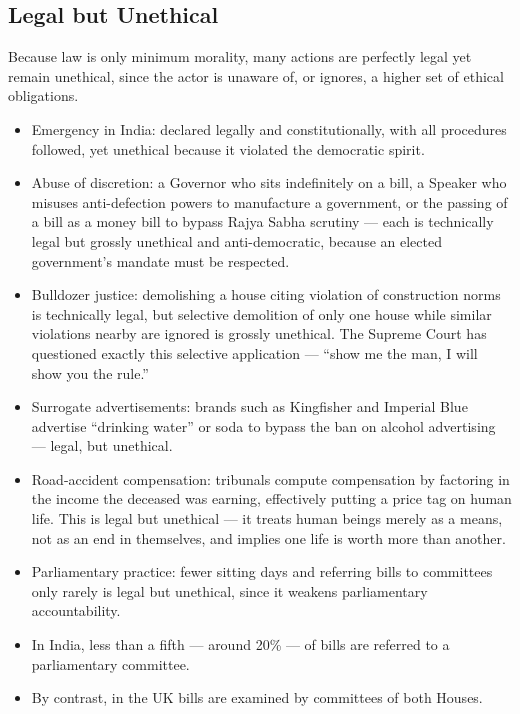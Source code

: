 \subsection{Legal but Unethical}

Because law is only minimum morality, many actions are perfectly legal yet remain unethical, since the actor is unaware of, or ignores, a higher set of ethical obligations.

\begin{itemize}
\item Emergency in India: declared legally and constitutionally, with all procedures followed, yet unethical because it violated the democratic spirit.
\item Abuse of discretion: a Governor who sits indefinitely on a bill, a Speaker who misuses anti-defection powers to manufacture a government, or the passing of a bill as a money bill to bypass Rajya Sabha scrutiny --- each is technically legal but grossly unethical and anti-democratic, because an elected government's mandate must be respected.
\item Bulldozer justice: demolishing a house citing violation of construction norms is technically legal, but selective demolition of only one house while similar violations nearby are ignored is grossly unethical. The Supreme Court has questioned exactly this selective application --- ``show me the man, I will show you the rule.''
\item Surrogate advertisements: brands such as Kingfisher and Imperial Blue advertise ``drinking water'' or soda to bypass the ban on alcohol advertising --- legal, but unethical.
\item Road-accident compensation: tribunals compute compensation by factoring in the income the deceased was earning, effectively putting a price tag on human life. This is legal but unethical --- it treats human beings merely as a means, not as an end in themselves, and implies one life is worth more than another.
\item Parliamentary practice: fewer sitting days and referring bills to committees only rarely is legal but unethical, since it weakens parliamentary accountability.
\end{itemize}

\begin{DataFact}
\begin{itemize}
\item In India, less than a fifth --- around 20\% --- of bills are referred to a parliamentary committee.
\item By contrast, in the UK bills are examined by committees of both Houses.
\end{itemize}
\end{DataFact}

